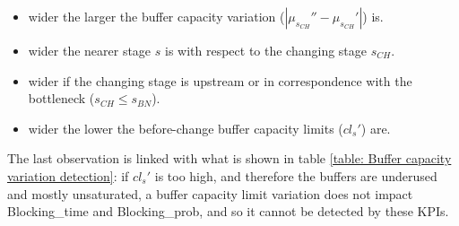 \begin{itemize}
\item wider the larger the buffer capacity variation ($|\mu_{s_{CH}}''-\mu_{s_{CH}}'|$) is.
\item wider the nearer stage $s$ is with respect to the changing stage $s_{CH}$.
\item wider if the changing stage is upstream or in correspondence with the bottleneck ($s_{CH}\leqslant s_{BN}$).
\item wider the lower the before-change buffer capacity limits ($cl_s'$) are.
\end{itemize}
The last observation is linked with what is shown in table \ref{table: Buffer capacity variation detection}: if $cl_s'$ is too high, and therefore the buffers are underused and mostly unsaturated, a buffer capacity limit variation does not impact Blocking\_time and Blocking\_prob, and so it cannot be detected by these KPIs. 
